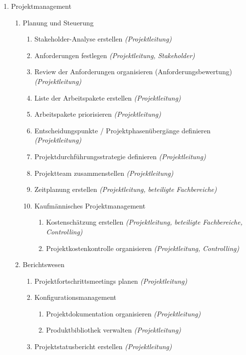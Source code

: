 \begin{enumerate}

	\item Projektmanagement
		\begin{enumerate}
			\item Planung und Steuerung
			\begin{enumerate}
				\item Stakeholder-Analyse erstellen \textit{(Projektleitung)}				
				\item Anforderungen festlegen \textit{(Projektleitung, Stakeholder)}
				\item Review der Anforderungen organisieren (Anforderungsbewertung) \textit{(Projektleitung)}
				\item Liste der Arbeitspakete erstellen \textit{(Projektleitung)}
				\item Arbeitspakete priorisieren \textit{(Projektleitung)}
				\item Entscheidungspunkte / Projektphasenübergänge definieren \textit{(Projektleitung)}
				\item Projektdurchführungsstrategie definieren \textit{(Projektleitung)}
				\item Projektteam zusammenstellen \textit{(Projektleitung)}				
				\item Zeitplanung erstellen \textit{(Projektleitung, beteiligte Fachbereiche)}	
				\item Kaufmännisches Projektmanagement
				\begin{enumerate}
					\item Kostenschätzung erstellen \textit{(Projektleitung, beteiligte Fachbereiche, Controlling)}					
					\item Projektkostenkontrolle organisieren \textit{(Projektleitung, Controlling)}
				\end{enumerate}
			\end{enumerate}
			\item Berichtswesen
			\begin{enumerate}
				\item Projektfortschrittsmeetings planen \textit{(Projektleitung)}
				\item Konfigurationsmanagement
				\begin{enumerate}
					\item Projektdokumentation organisieren \textit{(Projektleitung)}
					\item Produktbibliothek verwalten \textit{(Projektleitung)}
				\end{enumerate}
				\item Projektstatusbericht erstellen \textit{(Projektleitung)}

\end{enumerate}
\end{enumerate}
\end{enumerate}
